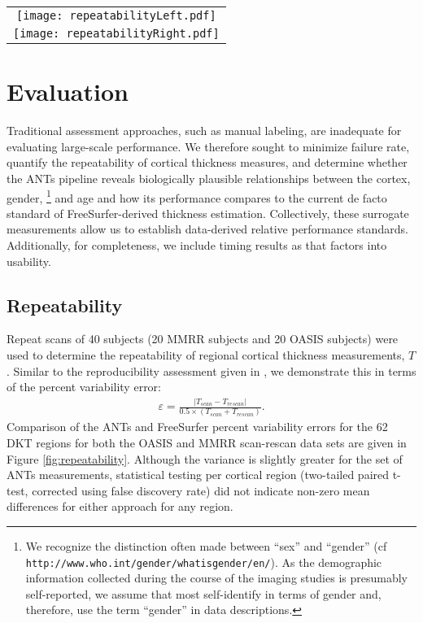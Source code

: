 \begin{figure*}[htb]
  \centering
  \begin{tabular}{c}
  \texttt{[image: repeatabilityLeft.pdf]} \\
  \texttt{[image: repeatabilityRight.pdf]}
  \end{tabular}
  \caption{Percent error variability for both ANTs and FreeSurfer pipelines 
           over the left and right hemispheres of both the MMRR and OASIS
           data subsets within the 62 regions defined by the
           Desikan-Killiany-Tourville atlas.  Both methods demonstrate good repeatability
           qualities.
           }
  \label{fig:repeatability}
\end{figure*}


\section{Evaluation}
Traditional assessment approaches, such as manual
labeling, are inadequate for evaluating large-scale performance.  
We therefore sought to minimize failure rate, quantify the repeatability of cortical
thickness measures, and
determine whether the ANTs pipeline reveals biologically plausible relationships
between the cortex, gender,%
\footnote{
We recognize the distinction often made between ``sex'' and ``gender'' 
(cf {\tt http://www.who.int/gender/whatisgender/en/}).
As the demographic information collected during the course of the imaging studies 
is presumably self-reported, we assume that most self-identify in terms of 
gender and, therefore, use the term ``gender'' in data
descriptions.
}
and age and how its performance compares
to the current de facto standard of FreeSurfer-derived thickness estimation.
Collectively, these surrogate
measurements allow us to establish data-derived relative performance standards.
Additionally, for completeness, we include timing results as that factors into
usability.

\subsection{Repeatability}%

Repeat scans of 40 subjects (20 MMRR subjects and 20 OASIS subjects) were 
used to determine the repeatability of regional cortical thickness 
measurements, $T$.  Similar to the reproducibility 
assessment given in \cite{jovicich2013}, we
demonstrate this in terms of the percent variability error:
\begin{align}
\varepsilon = \frac{|T_{scan} - T_{rescan}|}{0.5 \times (T_{scan} + T_{rescan})}.
\end{align}
Comparison of the ANTs and FreeSurfer percent variability errors for the 62 DKT 
regions for both the OASIS and MMRR scan-rescan data sets
are given in Figure \ref{fig:repeatability}.  Although the variance is slightly greater 
for the set of ANTs measurements, statistical testing per cortical region 
(two-tailed paired t-test, corrected using false discovery rate) did not indicate 
non-zero mean differences for either approach for any region.

